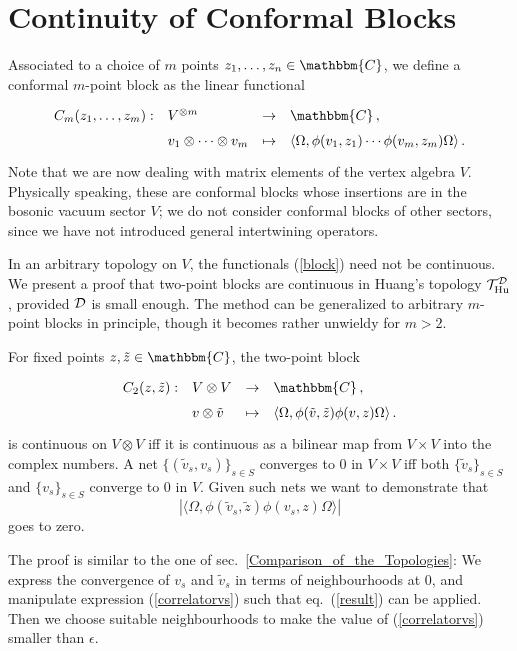 \documentclass[a4paper,12pt,twoside]{article}
\renewcommand{\b}{\langle}
\renewcommand{\k}{\rangle}
\renewcommand{\c}[1]{{\cal #1}}
\newcommand{\bC}{\mathbbm{C}}
\newcommand{\cT}{{\cal T}}
\newcommand{\eq}[1]{(\ref{#1})}
\newcommand{\D}{\c{D}}
\newcommand{\Hu}{{\rm Hu}}
\newcommand{\THud}{\cT_{\Hu}^{\D}}
\newcommand{\vt}{\tilde{v}}
\newcommand{\zt}{\tilde{z}}
\begin{document}
\section{Continuity of Conformal Blocks}
\label{Continuity_of_Conformal_Blocks}
Associated to a choice of $m$ points $z_1,\ldots,z_n\in\bC$,
we define a conformal $m$-point block as the linear
functional
\begin{equation}
\label{block}
\renewcommand{\arraystretch}{1.5}
\begin{array}{llll}
C_m(z_1,\ldots,z_m): & V^{\otimes m} & \to & \bC\,, \\
& v_1\otimes\cdots\otimes v_m & \mapsto &
\b\Omega,\phi(v_1,z_1)\cdots\phi(v_m,z_m)\Omega\k\,.
\end{array}
\end{equation}
Note that we are now dealing with matrix elements of
the vertex algebra $V$. Physically speaking, these are
conformal blocks whose insertions are in the bosonic vacuum
sector $V$; we do not consider conformal blocks of other
sectors, since we have not introduced general intertwining
operators.

In an arbitrary topology on $V$, the functionals \eq{block}
need not be continuous. We present a proof that
two-point blocks are continuous in Huang's topology
$\THud$, provided $\D$ is small enough.
The method can be generalized to arbitrary
$m$-point blocks in principle,
though it becomes rather unwieldy for $m>2$.

For fixed points $z, \zt\in\bC$, the two-point block
$$
\renewcommand{\arraystretch}{1.5}
\begin{array}{llll}
C_2(z,\zt): & V\otimes V & \to & \bC\,, \\
& v\otimes \vt & \mapsto &
\b\Omega,\phi(\vt,\zt)\phi(v,z)\Omega\k\,.
\end{array}
$$
is continuous on $V\otimes V$ iff it is
continuous as a bilinear map from $V\times V$
into the complex numbers.
A net $\{(\vt_s,v_s)\}_{s\in S}$
converges to 0 in $V\times V$ iff both
$\{\vt_s\}_{s\in S}$ and $\{v_s\}_{s\in S}$
converge to 0 in $V$.
Given such nets we want to demonstrate that
\begin{equation}
\label{correlatorvs}
|\b\Omega,\phi(\vt_s,\zt)\phi(v_s,z)\Omega\k|
\end{equation}
goes to zero.

The proof is similar to the one of sec.\ \ref{Comparison_of_the_Topologies}:
We express the convergence of $v_s$ and $\vt_s$ in terms of
neighbourhoods at 0, and manipulate expression \eq{correlatorvs}
such that eq.\ \eq{result} can be applied. Then we choose suitable neighbourhoods
to make the value of \eq{correlatorvs} smaller than $\epsilon$.
\end{document}
